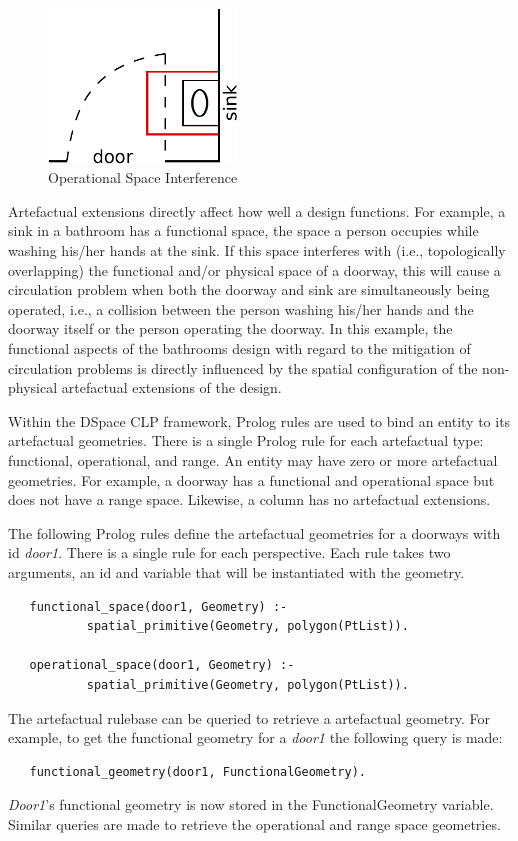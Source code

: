 \documentclass[12pt]{ucthesis}
\begin{document}
\begin{figure}[H]
\centering
\includegraphics[width=50mm]{door-sink}
\caption{Operational Space Interference}
\label{door-sink}
\end{figure}

Artefactual extensions directly affect how well a design functions. For example, a sink in a bathroom has a functional space, the space a person occupies while washing his/her hands at the sink. If this space interferes with (i.e., topologically overlapping) the functional and/or physical space of a doorway, this will cause a circulation problem when both the doorway and sink are simultaneously being operated, i.e., a collision between the person washing his/her hands and the doorway itself or the person operating the doorway. In this example, the functional aspects of the bathrooms design with regard to the mitigation of circulation problems is directly influenced by the spatial configuration of the non-physical artefactual extensions of the design. 

Within the DSpace CLP framework, Prolog rules are used to bind an entity to its artefactual geometries. There is a single Prolog rule for each artefactual type: functional, operational, and range. An entity may have zero or more artefactual geometries. For example, a doorway has a functional and operational space but does not have a range space. Likewise, a column has no artefactual extensions. 

The following Prolog rules define the artefactual geometries for a doorways with id \emph{door1}. There is a single rule for each perspective. Each rule takes two arguments, an id and variable that will be instantiated with the geometry. 
\begin{verbatim}      
   functional_space(door1, Geometry) :-
           spatial_primitive(Geometry, polygon(PtList)).
           
   operational_space(door1, Geometry) :-
           spatial_primitive(Geometry, polygon(PtList)).
\end{verbatim}

The artefactual rulebase can be queried to retrieve a artefactual geometry. For example, to get the functional geometry for a \emph{door1} the following query is made:
\begin{verbatim}
   functional_geometry(door1, FunctionalGeometry).
\end{verbatim}
\emph{Door1}'s functional geometry is now stored in the FunctionalGeometry variable. Similar queries are made to retrieve the operational and range space geometries.
\end{document}
